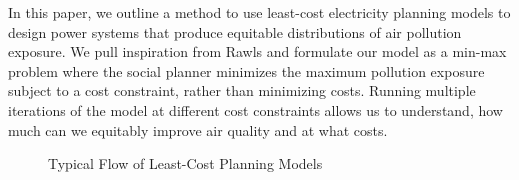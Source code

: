 \documentclass[a4paper]{article}
\theoremstyle{definition}
\theoremstyle{plain}
\begin{document}
In this paper, we outline a method to use least-cost electricity planning models to design power systems that produce equitable distributions of air pollution exposure.  We pull inspiration from Rawls and formulate our model as a min-max problem where the social planner minimizes the maximum pollution exposure subject to a cost constraint, rather than minimizing costs.  Running multiple iterations of the model at different cost constraints allows us to understand, how much can we equitably improve air quality and at what costs.
\begin{figure}
    \begin{center}
    \end{center}
    \caption{Typical Flow of Least-Cost Planning Models}
    \label{fig:enter-label}
\end{figure}
\end{document}
